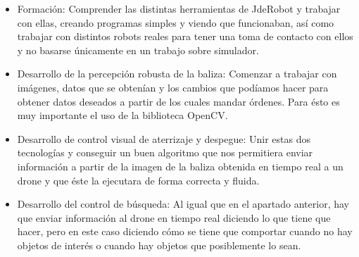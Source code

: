 \begin{itemize}
\item{Formaci\'on:} Comprender las distintas herramientas de JdeRobot y trabajar con ellas, creando programas simples y viendo que funcionaban, as\'i como trabajar con distintos robots reales para tener una toma de contacto con ellos y no basarse \'unicamente en un trabajo sobre simulador. 

\item{Desarrollo de la percepci\'on robusta de la baliza:} Comenzar a trabajar con im\'agenes, datos que se obten\'ian y los cambios que pod\'iamos hacer para obtener datos deseados a partir de los cuales mandar \'ordenes. Para \'esto es muy importante el uso de la biblioteca OpenCV.

\item{Desarrollo de control visual de aterrizaje y despegue:} Unir estas dos tecnolog\'ias y conseguir un buen algoritmo que nos permitiera enviar informaci\'on a partir de la imagen de la baliza obtenida en tiempo real a un drone y que \'este la ejecutara de forma correcta y fluida.  

\item{Desarrollo del control de b\'usqueda:} Al igual que en el apartado anterior, hay que enviar informaci\'on al drone en tiempo real diciendo lo que tiene que hacer, pero en este caso diciendo c\'omo se tiene que comportar cuando no hay objetos de inter\'es o cuando hay objetos que posiblemente lo sean. 


\end{itemize}






























